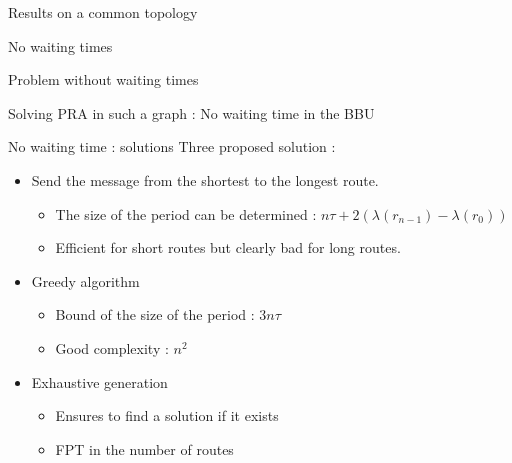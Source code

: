 \documentclass[10 pt]{beamer}
\begin{document}
\begin{section}{Results on a common topology}
\begin{subsection}{No waiting times}
\begin{frame}{Problem without waiting times}
{
}

\vspace{1cm}
Solving PRA in such a graph : No waiting time in the BBU

\end{frame}

\begin{frame}{No waiting time : solutions}
Three proposed solution :
\begin{itemize}
\item Send the message from the shortest to the longest route.
\begin{itemize}
\item The size of the period can be determined : $n\tau + 2(\lambda(r_{n-1}) - \lambda(r_{0}))$
\item Efficient for short routes but clearly bad for long routes.
\end{itemize}
\vspace{0.5cm}
\pause
\item Greedy algorithm
\begin{itemize}
\item Bound of the size of the period : $3n\tau$
\item Good complexity : $n^2$
\end{itemize}
\vspace{0.5cm}
\pause
\item Exhaustive generation
\begin{itemize}
\item Ensures to find a solution if it exists
\item FPT in the number of routes
\end{itemize}
\end{itemize}
\end{frame}



\end{subsection}
\end{section}
\end{document}
